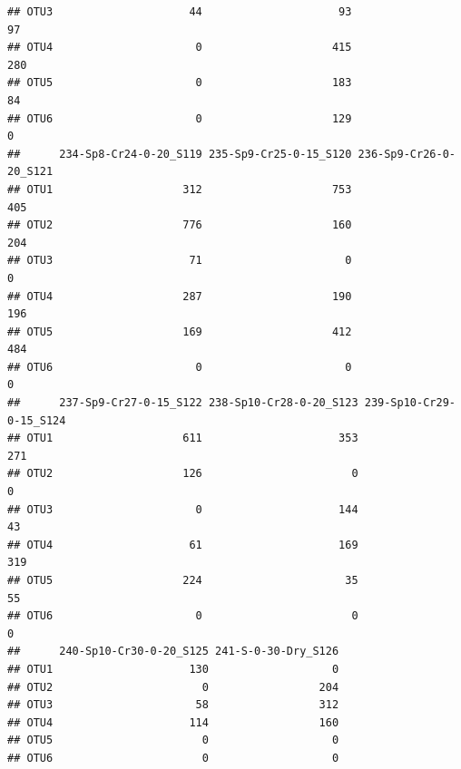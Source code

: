\documentclass[]{article}
\begin{document}
\begin{verbatim}
## OTU3                     44                     93                     97
## OTU4                      0                    415                    280
## OTU5                      0                    183                     84
## OTU6                      0                    129                      0
##      234-Sp8-Cr24-0-20_S119 235-Sp9-Cr25-0-15_S120 236-Sp9-Cr26-0-20_S121
## OTU1                    312                    753                    405
## OTU2                    776                    160                    204
## OTU3                     71                      0                      0
## OTU4                    287                    190                    196
## OTU5                    169                    412                    484
## OTU6                      0                      0                      0
##      237-Sp9-Cr27-0-15_S122 238-Sp10-Cr28-0-20_S123 239-Sp10-Cr29-0-15_S124
## OTU1                    611                     353                     271
## OTU2                    126                       0                       0
## OTU3                      0                     144                      43
## OTU4                     61                     169                     319
## OTU5                    224                      35                      55
## OTU6                      0                       0                       0
##      240-Sp10-Cr30-0-20_S125 241-S-0-30-Dry_S126
## OTU1                     130                   0
## OTU2                       0                 204
## OTU3                      58                 312
## OTU4                     114                 160
## OTU5                       0                   0
## OTU6                       0                   0
\end{verbatim}
\end{document}
